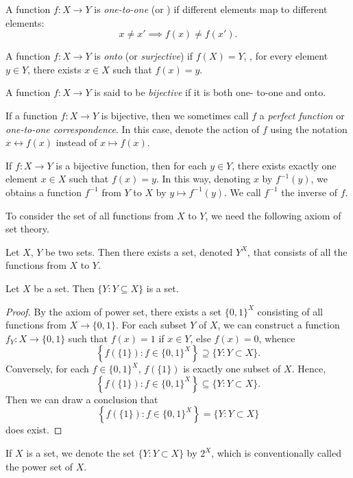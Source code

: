 \begin{defn}
A function $f: X \to Y$ is \emph{one-to-one} (or ) if 
different elements map to different elements: 
\begin{equation*}
    x \neq x' \implies f(x) \neq f(x'). 
\end{equation*}

A function $f: X \to Y$ is \emph{onto} (or \emph{surjective}) if $f(X) = Y$, 
\ie, for every element $y \in Y$, there exists $x \in X$ such that 
$f(x) = y$.

A function $f: X \to Y$ is said to be \emph{bijective} if it is both one-
to-one and onto. 
\end{defn}

\begin{rmk}
If a function $f: X \to Y$ is bijective, then we sometimes call $f$ a 
\emph{perfect function} or \emph{one-to-one correspondence}. 
In this case, denote the action of $f$ using the notation $x \leftrightarrow 
f(x)$ instead of $x \mapsto f(x)$. 
\end{rmk}

If $f: X \to Y$ is a bijective function, then for each $y \in Y$, there 
exists exactly one element $x \in X$ such that $f(x) = y$. 
In this way, denoting $x$ by $f^{-1}(y)$, we obtains a function $f^{-1}$ 
from $Y$ to $X$ by $y \mapsto f^{-1}(y)$. 
We call $f^{-1}$ the inverse of $f$. 

To consider the set of all functions from $X$ to $Y$, we need the following 
axiom of set theory. 
\begin{axiom}
Let $X$, $Y$ be two sets. 
Then there exists a set, denoted $Y^X$, that consists of all the functions 
from $X$ to $Y$. 
\end{axiom}

\begin{prop}
Let $X$ be a set. 
Then $\{Y: Y \subseteq X\}$ is a set. 
\end{prop}
\begin{proof}
By the axiom of power set, there exists a set $\{0, 1\}^X$ consisting of 
all functions from $X \to \{0, 1\}$. 
For each subset $Y$ of $X$, we can construct a function $f_Y: X \to 
\{0, 1\}$ such that $f(x) = 1$ if $x \in Y$, else $f(x) = 0$, whence 
\begin{equation*}
    \left\{ f(\{1\}): f \in \{0, 1\} ^X \right\}
    \supseteq \{ Y: Y \subset X\}. 
\end{equation*}
Conversely, for each $f \in \{0, 1\}^X$, $f(\{1\})$ is exactly one subset 
of $X$. 
Hence, 
\begin{equation*}
    \left\{ f(\{1\}): f \in \{0, 1\} ^X \right\}
    \subseteq \{ Y: Y \subset X\}. 
\end{equation*}
Then we can draw a conclusion that 
\begin{equation*}
    \left\{ f(\{1\}): f \in \{0, 1\} ^X \right\}
    = \{ Y: Y \subset X\}
\end{equation*}
does exist.
\end{proof}
If $X$ is a set, we denote the set $\{Y: Y \subset X\}$ by $2^X$, which is 
conventionally called the power set of $X$. 

